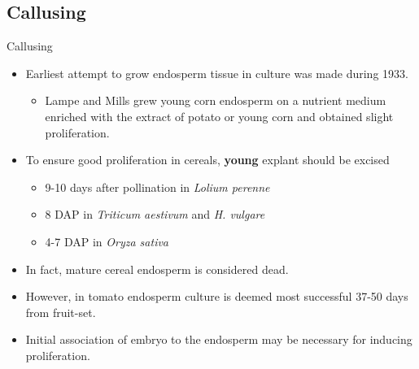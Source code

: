 \documentclass[
  ignorenonframetext,
  aspectratio=169]{beamer}
\providecommand{\tightlist}{%
  \setlength{\itemsep}{0pt}\setlength{\parskip}{0pt}}
\newcommand{\ecolumns}{\end{columns}}
\begin{document}

\hypertarget{callusing}{%
\subsection{Callusing}\label{callusing}}

\begin{frame}{Callusing}
\begin{itemize}
\tightlist
\item
  Earliest attempt to grow endosperm tissue in culture was made during
  1933.

  \begin{itemize}
  \tightlist
  \item
    Lampe and Mills grew young corn endosperm on a nutrient medium
    enriched with the extract of potato or young corn and obtained
    slight proliferation.
  \end{itemize}
\item
  To ensure good proliferation in cereals, \textbf{young} explant should
  be excised

  \begin{itemize}
  \tightlist
  \item
    9-10 days after pollination in \emph{Lolium perenne}
  \item
    8 DAP in \emph{Triticum aestivum} and \emph{H. vulgare}
  \item
    4-7 DAP in \emph{Oryza sativa}
  \end{itemize}
\item
  In fact, mature cereal endosperm is considered dead.
\item
  However, in tomato endosperm culture is deemed most successful 37-50
  days from fruit-set.
\item
  Initial association of embryo to the endosperm may be necessary for
  inducing proliferation.
\end{itemize}
\end{frame}
\end{document}
